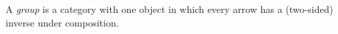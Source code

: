 A \emph{group} is a category with one object in which every arrow has a (two-sided) inverse under composition.
